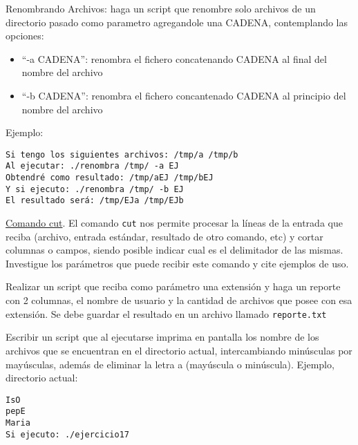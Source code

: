 \begin{questions}

\item Renombrando Archivos: haga un script que renombre solo archivos de un directorio pasado como parametro agregandole una CADENA, contemplando las opciones:
\begin{itemize}
\item ``-a CADENA'': renombra el fichero concatenando CADENA al final del nombre del archivo
\item ``-b CADENA'': renombra el fichero concantenado CADENA al principio del nombre del archivo
\end{itemize}
Ejemplo:
\begin{verbatim}
Si tengo los siguientes archivos: /tmp/a /tmp/b
Al ejecutar: ./renombra /tmp/ -a EJ
Obtendré como resultado: /tmp/aEJ /tmp/bEJ
Y si ejecuto: ./renombra /tmp/ -b EJ
El resultado será: /tmp/EJa /tmp/EJb
\end{verbatim}

\item \underline{Comando cut}. El comando \texttt{cut} nos permite procesar la líneas de la entrada que reciba (archivo, entrada estándar, resultado de otro comando, etc) y cortar columnas o campos, siendo posible indicar cual es el delimitador de las mismas. Investigue los parámetros que puede recibir este comando y cite ejemplos de uso.

\item Realizar un script que reciba como parámetro una extensión y haga un reporte con 2 columnas, el nombre de usuario y la cantidad de archivos que posee con esa extensión. Se debe guardar el resultado en un archivo llamado \texttt{reporte.txt}

\item Escribir un script que al ejecutarse imprima en pantalla los nombre de los archivos que se encuentran en el directorio actual, intercambiando minúsculas por mayúsculas, además de eliminar la letra a (mayúscula o minúscula). Ejemplo, directorio actual:
\begin{verbatim}
IsO
pepE
Maria
Si ejecuto: ./ejercicio17
\end{verbatim}


\end{questions}
